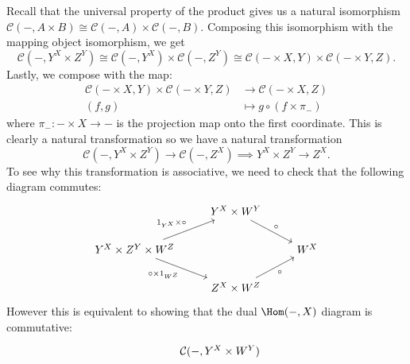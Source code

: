 \documentclass[11pt,letterpaper]{article}
\def\CC{\mathcal{C}}
\begin{document}
\begin{solution}
    \begin{solution}
        \quad Recall that the universal property of the product gives us a natural isomorphism $\CC(-,A\times B) \cong \CC(-,A)\times \CC(-,B)$. Composing this isomorphism with the mapping object isomorphism, we get
        \[
            \CC(-, Y^X\times Z^Y) \cong \CC(-,Y^X)\times \CC(-,Z^Y) \cong \CC(-\times X, Y) \times \CC(-\times Y, Z)
        .\] 
        Lastly, we compose with the map:
        \[
            \begin{aligned}
                \CC(-\times X, Y)\times \CC(-\times Y, Z) &\to \CC(-\times X, Z) \\
                (f,g) &\mapsto g\circ (f\times \pi_-)
            \end{aligned}
        \] 
        where $\pi_- : -\times X \to -$ is the projection map onto the first coordinate. This is clearly a natural transformation so we have a natural transformation
        \[
            \CC(-, Y^X\times Z^Y) \to \CC(-, Z^X) \implies Y^X\times Z^Y \to Z^X
        .\]
        \quad To see why this transformation is associative, we need to check that the following diagram commutes:
        \[\begin{tikzcd}[ampersand replacement=\&]
            \& {Y^X\times W^Y} \\
            {Y^X\times Z^Y\times W^Z} \&\& {W^X} \\
            \& {Z^X\times W^Z}
            \arrow["{\circ\times1_{W^Z}}"', from=2-1, to=3-2]
            \arrow["\circ"', from=3-2, to=2-3]
            \arrow["{1_{Y^X}\times \circ}", from=2-1, to=1-2]
            \arrow["\circ", from=1-2, to=2-3]
        \end{tikzcd}\]
        However this is equivalent to showing that the dual $\Hom(-,X)$ diagram is commutative:
\[\begin{tikzcd}[ampersand replacement=\&]
	\& {\CC(-,Y^X\times W^Y)} \\

\end{tikzcd}\]
\end{solution}
\end{solution}
\end{document}
